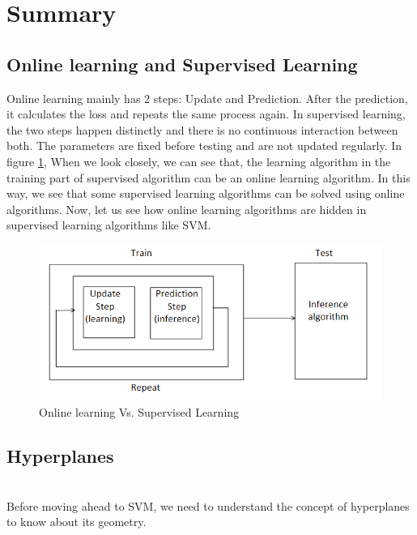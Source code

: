 \documentclass[11pt]{article}
\begin{document}
\section{Summary}
\subsection{Online learning and Supervised Learning}
\normalfont
Online learning mainly has 2 steps: Update and Prediction. After the prediction, it calculates the loss and repeats the same process again. In supervised learning, the two steps happen distinctly and there is no continuous interaction between both. The parameters are fixed before testing and are not updated regularly. In figure \ref{fig:online}, When we look closely, we can see that, the learning algorithm in the training part of supervised algorithm can be an online learning algorithm. In this way, we see that some supervised learning algorithms can be solved using online algorithms. Now, let us see how online learning algorithms are hidden in supervised learning algorithms like SVM.
\begin{figure}[h!]
    \centering
  \includegraphics[scale=0.7]{fig1.PNG}
  \caption{Online learning Vs. Supervised Learning}
  \label{fig:online}
\end{figure}
\subsection{Hyperplanes}
\\\normalfont
Before moving ahead to SVM, we need to understand the concept of hyperplanes to know about its geometry.
\end{document}
